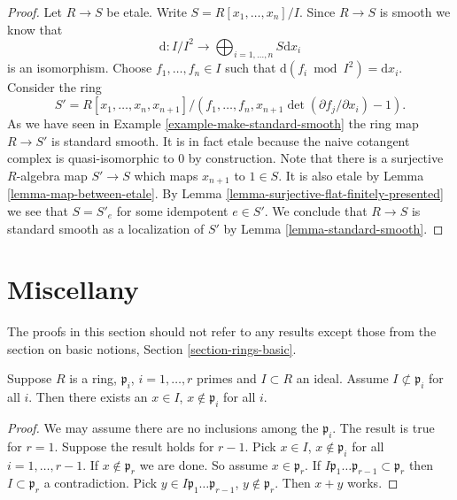 \begin{proof}
Let $R \to S$ be etale. Write $S = R[x_1, \ldots, x_n]/I$. Since $R \to S$ is
smooth we know that
$$
\text{d} :
I/I^2
\longrightarrow
\bigoplus\nolimits_{i = 1, \ldots, n} S\text{d}x_i
$$
is an isomorphism. Choose $f_1, \ldots, f_n \in I$ such that
$\text{d}(f_i \bmod I^2) = \text{d}x_i$. Consider the ring
$$
S' = R[x_1, \ldots, x_n, x_{n + 1}]/
(f_1, \ldots, f_n, x_{n + 1}\det(\partial f_j/\partial x_i) - 1).
$$
As we have seen in Example \ref{example-make-standard-smooth}
the ring map $R \to S'$ is standard smooth. It is in fact etale because
the naive cotangent complex is quasi-isomorphic to $0$ by construction. Note
that there is a surjective $R$-algebra map $S' \to S$ which maps $x_{n + 1}$
to $1 \in S$. It is also etale by Lemma \ref{lemma-map-between-etale}.
By Lemma \ref{lemma-surjective-flat-finitely-presented}
we see that $S = S'_e$ for some idempotent $e \in S'$.
We conclude that $R \to S$ is standard smooth as a localization of $S'$ by
Lemma \ref{lemma-standard-smooth}.
\end{proof}














\section{Miscellany}
\label{section-miscellany}

\noindent
The proofs in this section should not refer to any results except
those from the section on basic notions, Section \ref{section-rings-basic}.

\begin{lemma}
\label{lemma-silly}
Suppose $R$ is a ring, $\mathfrak p_i$, $i=1,\ldots,r$ primes
and $I \subset R$ an ideal. Assume $I \not\subset \mathfrak p_i$
for all $i$. Then there exists an $x\in I$, $x\not\in \mathfrak p_i$ for
all $i$.
\end{lemma}

\begin{proof}
We may assume there are no inclusions among the $\mathfrak p_i$.
The result is true for $r = 1$.
Suppose the result holds for $r-1$.
Pick $x \in I$, $x \not \in \mathfrak p_i$ for all $i=1,\ldots,r-1$.
If $x \not\in \mathfrak p_r$ we are done. So assume $x \in \mathfrak p_r$.
If $I\mathfrak p_1 \ldots \mathfrak p_{r-1} \subset \mathfrak p_r$
then $I \subset \mathfrak p_r$ a contradiction.
Pick $y \in I\mathfrak p_1 \ldots \mathfrak p_{r-1}$,
$y \not \in \mathfrak p_r$. Then $x+y$ works.
\end{proof}

